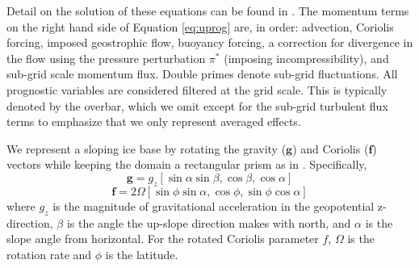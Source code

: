 \documentclass[draft]{agujournal2019}
\begin{document}
Detail on the solution of these equations can be found in \cite{maronga_parallelized_2015}. The momentum terms on the right hand side of Equation \ref{eq:uprog} are, in order: advection, Coriolis forcing, imposed geostrophic flow, buoyancy forcing, a correction for divergence in the flow using the pressure perturbation $\pi^*$ (imposing incompressibility), and sub-grid scale momentum flux. Double primes denote sub-grid fluctuations. All prognostic variables are considered filtered at the grid scale. This is typically denoted by the overbar, which we omit except for the sub-grid turbulent flux terms to emphasize that we only represent averaged effects. 

We represent a sloping ice base by rotating the gravity ($\textbf{g}$) and Coriolis ($\textbf{f}$) vectors while keeping the domain a rectangular prism as in . 
Specifically, 
\begin{equation} \label{eq:g}
	\textbf{g} = g_z [\sin \alpha \sin \beta,\cos \beta,\cos \alpha]
\end{equation}
\begin{equation} \label{eq:f}
    \textbf{f} = 2 \Omega [\sin \phi \sin \alpha,\cos \phi,\sin \phi \cos \alpha]
\end{equation}
where $g_z$ is the magnitude of gravitational acceleration in the geopotential z-direction, $\beta$ is the angle the up-slope direction makes with north, and $\alpha$ is the slope angle from horizontal. For the rotated Coriolis parameter $f$, $\Omega$ is the rotation rate and $\phi$ is the latitude. 
\end{document}
